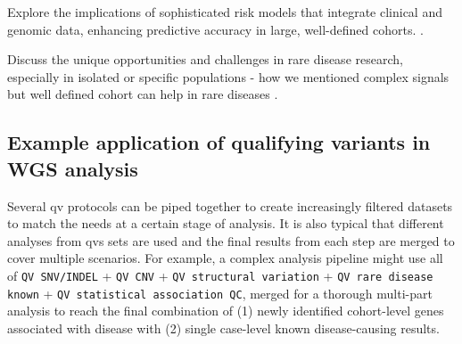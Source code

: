 Explore the implications of sophisticated risk models that integrate clinical and genomic data, enhancing predictive accuracy in large, well-defined cohorts.
\cite{riveros2021integrated, weale2021validation, sun2021polygenic}.

Discuss the unique opportunities and challenges in rare disease research, especially in isolated or specific populations - how we mentioned complex signals but well defined cohort can help in rare diseases
\cite{lim2014distribution}. %

\subsection{Example application of qualifying variants in WGS analysis}

Several \ac{qv} protocols can be piped together to create increasingly filtered datasets to match the needs at a certain stage of analysis. It is also typical that different analyses from \ac{qv}s sets are used and the final results from each step are merged to cover multiple scenarios. For example, a complex analysis pipeline might use all of
\colorbox{kispiblue!30}{\texttt{QV SNV/INDEL}} + 
\colorbox{kispiblue!30}{\texttt{QV CNV}} + 
\colorbox{kispiblue!30}{\texttt{QV structural variation}} + 
\colorbox{kispiblue!30}{\texttt{QV rare disease known}} + 
\colorbox{kispiblue!30}{\texttt{QV statistical association QC}}, merged for a thorough multi-part analysis to reach the final combination of (1) newly identified cohort-level genes associated with disease with (2) single case-level known disease-causing results.

